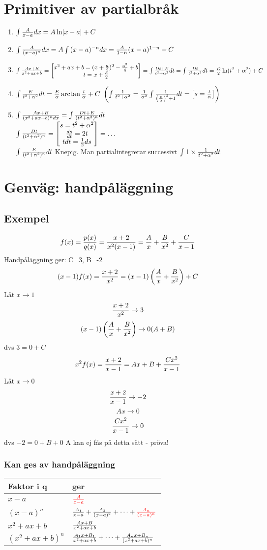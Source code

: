 \documentclass{article}
\newcommand{\xa}{x-a}
\newcommand{\xan}[1]{(\xa)^{#1}}
\newcommand{\xab}{x^2+ax+b}
\newcommand{\xabn}[1]{(\xab)^{#1}}
\begin{document}
\section{Primitiver av partialbråk}
\begin{enumerate}
    \item $\int{\frac{A}{x-a} dx} = A\ln\lvert x-a\rvert +C$
    \item $\int{\frac{A}{(x-a)^n} dx} = A\int{(x-a)^{-n}dx} = \frac{A}{1-n}(x-a)^{1-n} + C $
    \item $\int{\f{Ax+B}{\xab}} = \bmat{\xab = (x+\f a2)^2 - \f {a^2}4 + b \\ t =x+\f a2} =
      \int{\f{Dt+E}{t^2+\alpha^2} dt} = \int{\f{Dt}{t^2+\alpha^2}dt}= \f D2 \ln(t^2+\alpha^2) + C$
    \item $\int{\frac{E}{t^2+\alpha^2} dt} = \frac{E}{\alpha} \arctan \frac{t}{\alpha} + C\ \left(\int{\frac{1}{t^2+\alpha^2}} = \frac{1}{\alpha^2}\int{\frac{1}{\left(\frac{t}{\alpha}\right)^2 + 1}dt} = \left[\begin{matrix}s=\frac{t}{\alpha}\end{matrix}\right]\right)$
    \item $\int{\f{Ax+B}{\xabn{n} dx} = \int{\f{Dt+E}{(t^2+\alpha^2)^n}dt}}$\\
      $\int{\frac{Dt}{(t^2+\alpha^2)^n} = \left[\begin{matrix}s=t^2+\alpha^2 \\ \frac{ds}{dt} = 2t \\ tdt = \frac{1}{2} ds\end{matrix}\right] = \dots}$\\
      $\int{\frac{E}{(t^2+\alpha^2)^n}dt}$ Knepig. Man partialintegrerar successivt $\int{1\times\frac{1}{t^2+\alpha^2}dt}$
\end{enumerate}

\section{Genväg: handpåläggning}
\subsection{Exempel}
$$ f(x) = \frac{p(x)}{q(x)} = \frac{x+2}{x^2(x-1)} = \frac{A}{x} + \frac{B}{x^2} + \frac{C}{x-1} $$
Handpåläggning ger: C=3, B=-2\\
$$ (x-1)f(x) = \frac{x+2}{x^2} = (x-1)\left(\frac{A}{x} + \frac{B}{x^2}\right) + C $$
Låt $x\to 1$
$$ \frac{x+2}{x^2}\to 3$$
$$(x-1)\left(\frac{A}{x} + \frac{B}{x^2}\right) \to 0(A+B) $$
dvs $3=0+C$
$$x^2f(x) = \frac{x+2}{x-1} = Ax+B + \frac{Cx^2}{x-1}$$
Låt $x\to 0$
$$\frac{x+2}{x-1} \to -2$$
$$Ax\to 0$$
$$ \frac{Cx^2}{x-1} \to 0$$
dvs $-2 = 0+B+0$
A kan ej fås på detta sätt - pröva!

\subsubsection{Kan ges av handpåläggning}
\begin{tabular}{ l l }
  Faktor i q & ger \\\hline
  $\xa$ & ${\color{red}\f{A}{\xa}}$\\
  $\xan{n}$ & $\f{A_1}{\xa}+\f{A_2}{\xan{2}}+\cdots+{\color{red}\f{A_n}{\xan{n}}}$\\
  $\xab$ & $\f{Ax+B}{\xab}$\\
  $\xabn{n}$ & $\f{A_1x+B_1}{\xab}+\cdots+\f{A_nx+B_n}{\xabn{n}}$\\
\end{tabular}
\end{document}
